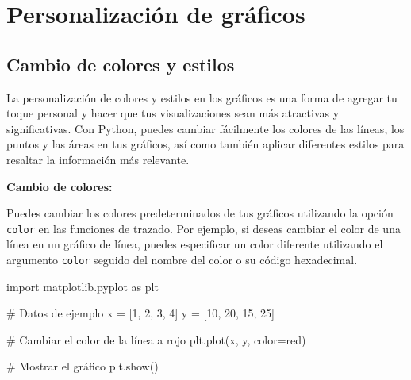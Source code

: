 \documentclass[
  a4paper,
]{article}
\newenvironment{Shaded}{}{}
\newcommand{\CommentTok}[1]{\textcolor[rgb]{0.42,0.45,0.49}{#1}}
\newcommand{\DecValTok}[1]{\textcolor[rgb]{0.00,0.36,0.77}{#1}}
\newcommand{\ImportTok}[1]{\textcolor[rgb]{0.01,0.18,0.38}{#1}}
\newcommand{\NormalTok}[1]{\textcolor[rgb]{0.14,0.16,0.18}{#1}}
\newcommand{\OperatorTok}[1]{\textcolor[rgb]{0.14,0.16,0.18}{#1}}
\newcommand{\StringTok}[1]{\textcolor[rgb]{0.01,0.18,0.38}{#1}}
\begin{document}
\hypertarget{personalizaciuxf3n-de-gruxe1ficos}{%
\section{Personalización de
gráficos}\label{personalizaciuxf3n-de-gruxe1ficos}}

\hypertarget{cambio-de-colores-y-estilos}{%
\subsection{Cambio de colores y
estilos}\label{cambio-de-colores-y-estilos}}

La personalización de colores y estilos en los gráficos es una forma de
agregar tu toque personal y hacer que tus visualizaciones sean más
atractivas y significativas. Con Python, puedes cambiar fácilmente los
colores de las líneas, los puntos y las áreas en tus gráficos, así como
también aplicar diferentes estilos para resaltar la información más
relevante.

\textbf{Cambio de colores:}

Puedes cambiar los colores predeterminados de tus gráficos utilizando la
opción \texttt{color} en las funciones de trazado. Por ejemplo, si
deseas cambiar el color de una línea en un gráfico de línea, puedes
especificar un color diferente utilizando el argumento \texttt{color}
seguido del nombre del color o su código hexadecimal.

\begin{Shaded}
\begin{Highlighting}[]
\ImportTok{import}\NormalTok{ matplotlib.pyplot }\ImportTok{as}\NormalTok{ plt}

\CommentTok{\# Datos de ejemplo}
\NormalTok{x }\OperatorTok{=}\NormalTok{ [}\DecValTok{1}\NormalTok{, }\DecValTok{2}\NormalTok{, }\DecValTok{3}\NormalTok{, }\DecValTok{4}\NormalTok{]}
\NormalTok{y }\OperatorTok{=}\NormalTok{ [}\DecValTok{10}\NormalTok{, }\DecValTok{20}\NormalTok{, }\DecValTok{15}\NormalTok{, }\DecValTok{25}\NormalTok{]}

\CommentTok{\# Cambiar el color de la línea a rojo}
\NormalTok{plt.plot(x, y, color}\OperatorTok{=}\StringTok{\textquotesingle{}red\textquotesingle{}}\NormalTok{)}

\CommentTok{\# Mostrar el gráfico}
\NormalTok{plt.show()}
\end{Highlighting}
\end{Shaded}
\end{document}
